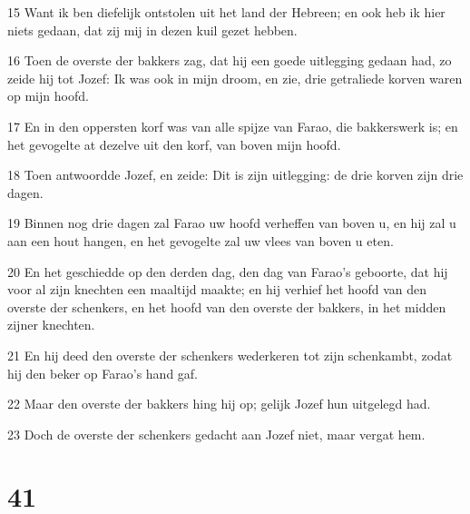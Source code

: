 \par 15 Want ik ben diefelijk ontstolen uit het land der Hebreen; en ook heb ik hier niets gedaan, dat zij mij in dezen kuil gezet hebben.
\par 16 Toen de overste der bakkers zag, dat hij een goede uitlegging gedaan had, zo zeide hij tot Jozef: Ik was ook in mijn droom, en zie, drie getraliede korven waren op mijn hoofd.
\par 17 En in den oppersten korf was van alle spijze van Farao, die bakkerswerk is; en het gevogelte at dezelve uit den korf, van boven mijn hoofd.
\par 18 Toen antwoordde Jozef, en zeide: Dit is zijn uitlegging: de drie korven zijn drie dagen.
\par 19 Binnen nog drie dagen zal Farao uw hoofd verheffen van boven u, en hij zal u aan een hout hangen, en het gevogelte zal uw vlees van boven u eten.
\par 20 En het geschiedde op den derden dag, den dag van Farao's geboorte, dat hij voor al zijn knechten een maaltijd maakte; en hij verhief het hoofd van den overste der schenkers, en het hoofd van den overste der bakkers, in het midden zijner knechten.
\par 21 En hij deed den overste der schenkers wederkeren tot zijn schenkambt, zodat hij den beker op Farao's hand gaf.
\par 22 Maar den overste der bakkers hing hij op; gelijk Jozef hun uitgelegd had.
\par 23 Doch de overste der schenkers gedacht aan Jozef niet, maar vergat hem.

\chapter{41}

